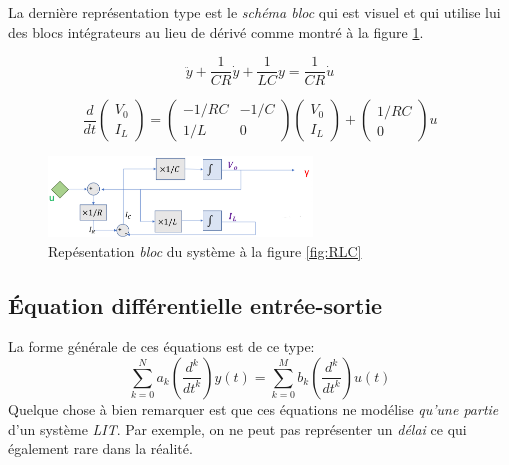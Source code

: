 \documentclass{report}
\begin{document}
La dernière représentation type est le \textit{schéma bloc} qui est visuel et qui utilise lui des blocs intégrateurs au lieu de dérivé comme montré à la figure \ref{fig:bloc}.

\begin{equation} \label{eqn:es}
\ddot{y} + \frac{1}{CR}\dot{y} + \frac{1}{LC}y = \frac{1}{CR}\dot{u}
\end{equation}

\begin{equation} \label{eqn:mat}
\frac{d}{dt}\begin{pmatrix}
V_0\\
I_L
\end{pmatrix} = \begin{pmatrix}
-1/RC & -1/C\\
1/L & 0
\end{pmatrix} \begin{pmatrix}
V_0\\
I_L
\end{pmatrix} + \begin{pmatrix}
1/RC\\
0
\end{pmatrix} u
\end{equation}

\begin{figure}[H] 
\centering
\includegraphics[width=7cm]{img/bloc.png}
\caption{Repésentation \textit{bloc} du système à la figure \ref{fig:RLC}}
\label{fig:bloc}
\end{figure}

\subsection{Équation différentielle entrée-sortie}
La forme générale de ces équations est de ce type:
\begin{equation}\label{eqn:difes}
\sum_{k = 0}^{N} a_k (\frac{d^k}{dt^k}) y(t) = \sum_{k = 0}^M b_k (\frac{d^k}{dt^k}) u(t)
\end{equation}
Quelque chose à bien remarquer est que ces équations ne modélise \textit{qu'une partie} d'un système \textit{LIT}. Par exemple, on ne peut pas représenter un \textit{délai} ce qui également rare dans la réalité.\\
\end{document}
